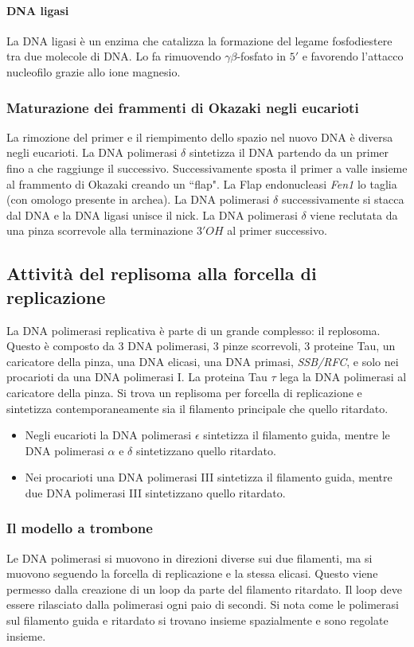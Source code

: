 \paragraph{DNA ligasi}
La DNA ligasi \`e un enzima che catalizza la formazione del legame fosfodiestere tra due molecole di DNA. Lo fa rimuovendo $\gamma\beta$-fosfato in $5'$ e favorendo l'attacco nucleofilo
grazie allo ione magnesio. 
\subsubsection{Maturazione dei frammenti di Okazaki negli eucarioti}
La rimozione del primer e il riempimento dello spazio nel nuovo DNA \`e diversa negli eucarioti. La DNA polimerasi $\delta$ sintetizza il DNA partendo da un primer fino a che 
raggiunge il successivo. Successivamente sposta il primer a valle insieme al frammento di Okazaki creando un ``flap". La Flap endonucleasi \emph{Fen1} lo taglia (con omologo presente in
archea). La DNA polimerasi $\delta$ successivamente si stacca dal DNA e la DNA ligasi unisce il nick. La DNA polimerasi $\delta$ viene reclutata da una pinza scorrevole alla terminazione
$3'OH$ al primer successivo. 
\subsection{Attivit\`a del replisoma alla forcella di replicazione}
La DNA polimerasi replicativa \`e parte di un grande complesso: il replosoma. Questo \`e composto da $3$ DNA polimerasi, $3$ pinze scorrevoli, $3$ proteine Tau, un caricatore della
pinza, una DNA elicasi, una DNA primasi, \emph{SSB/RFC}, e solo nei procarioti da una DNA polimerasi I. La proteina Tau $\tau$ lega la DNA polimerasi al caricatore della pinza. Si 
trova un replisoma per forcella di replicazione e sintetizza contemporaneamente sia il filamento principale che quello ritardato. 
\begin{itemize}
	\item Negli eucarioti la DNA polimerasi $\epsilon$ sintetizza il filamento guida, mentre le DNA polimerasi $\alpha$ e $\delta$ sintetizzano quello ritardato.
	\item Nei procarioti una DNA polimerasi III sintetizza il filamento guida, mentre due DNA polimerasi III sintetizzano quello ritardato.
\end{itemize}
\subsubsection{Il modello a trombone}
Le DNA polimerasi si muovono in direzioni diverse sui due filamenti, ma si muovono seguendo la forcella di replicazione e la stessa elicasi. Questo viene permesso dalla creazione di 
un loop da parte del filamento ritardato. Il loop deve essere rilasciato dalla polimerasi ogni paio di secondi. Si nota come le polimerasi sul filamento guida e ritardato si trovano
insieme spazialmente e sono regolate insieme. 
